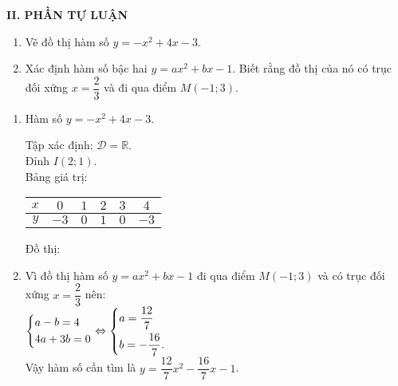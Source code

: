 \noindent\textbf{II. PHẦN TỰ LUẬN}
\begin{bt}%
 \textrm{}
 \begin{enumerate}
  \item Vẽ đồ thị hàm số $y = -x^2 + 4x - 3$.
  \item Xác định hàm số bậc hai $y = ax^2 + bx - 1$. Biết rằng đồ thị của nó có trục đối xứng $x = \dfrac{2}{3}$ và đi qua điểm $M(-1;3)$.
 \end{enumerate}
 \loigiai
 {
 \begin{enumerate}
  \item Hàm số $y = -x^2 + 4x - 3$.
  \immini
  {
  Tập xác định: $\mathscr{D} = \mathbb{R}$.\\
  Đỉnh $I(2;1)$.\\
  Bảng giá trị:
  \begin{center}
  \begin{tabular}{|c|c|c|c|c|c|}
   \hline
   $x$ & $0$ & $1$ & $2$ & $3$ & $4$\\
   \hline
   $y$ & $-3$ & $0$ & $1$ & $0$ & $-3$\\
   \hline
  \end{tabular}
 \end{center}
  }
  {
  Đồ thị:\\
  }
  \item Vì đồ thị hàm số $y = ax^2 + bx - 1$ đi qua điểm $M(-1;3)$ và có trục đối xứng $x = \dfrac{2}{3}$ nên:\\
 $\left\{\begin{aligned}& a - b = 4 \\& 4a + 3b = 0\end{aligned}\right. \Leftrightarrow \left\{\begin{aligned}& a = \dfrac{12}{7} \\& b = -\dfrac{16}{7}.\end{aligned}\right.$\\
 Vậy hàm số cần tìm là $y = \dfrac{12}{7}x^2 - \dfrac{16}{7}x - 1$.
 \end{enumerate}
 }
\end{bt}


